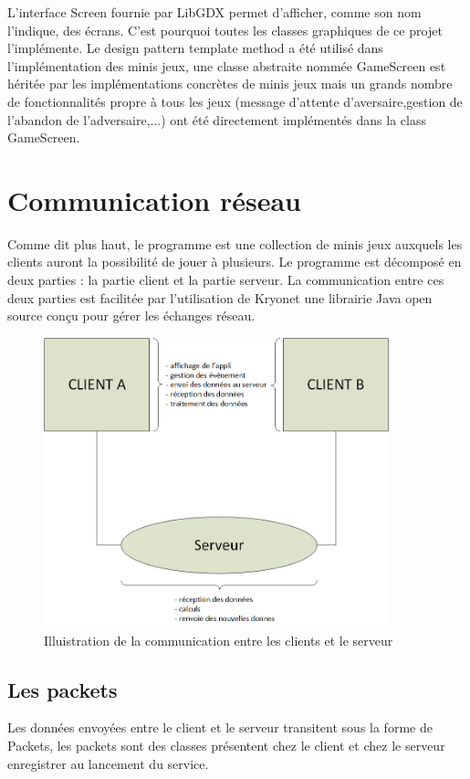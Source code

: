 \documentclass{report}
\begin{document}
L'interface Screen fournie par LibGDX permet d'afficher, comme son nom l'indique, des écrans. C'est pourquoi toutes les classes graphiques de ce
projet l'implémente. Le design pattern template method a été utilisé dans l'implémentation des minis jeux, une classe abstraite nommée GameScreen est héritée
par les implémentations concrètes de minis jeux mais un grands nombre de fonctionnalités propre à tous les jeux (message d'attente d'aversaire,gestion de l'abandon de l'adversaire,...)
ont été directement implémentés dans la class GameScreen.

\chapter{Communication réseau}
Comme dit plus haut, le programme est une collection de minis jeux auxquels les clients auront la possibilité de jouer à
plusieurs. Le programme est décomposé en deux parties : la partie client et la partie serveur. La communication entre ces
deux parties est facilitée par l'utilisation de Kryonet une librairie Java open source conçu pour gérer les échanges réseau.

\begin{figure}[H]
	\centering\includegraphics[width=10cm]{maquette_Base}
	\caption{Illuistration de la communication entre les clients et le serveur}
\end{figure}


\section{Les packets}
Les données envoyées entre le client et le serveur transitent sous la forme de Packets, les packets sont des classes présentent
chez le client et chez le serveur enregistrer au lancement du service.
\end{document}

